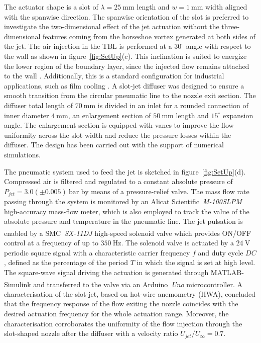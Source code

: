 The actuator shape is a slot of $\lambda = 25~\mathrm{mm}$ length and $w = 1~\mathrm{mm}$ width aligned with the spanwise direction. The spanwise orientation of the slot is preferred to investigate the two-dimensional effect of the jet actuation without the three-dimensional features coming from the horseshoe vortex generated at both sides of the jet.
The air injection in the TBL is performed at a $30^\circ$ angle with respect to the wall as shown in figure~\ref{fig:SetUp}(c). This inclination is suited to energize the lower region of the boundary layer, since the injected flow remains attached to the wall \citep{Steinfurth2021pulsedjet}. Additionally, this is a standard configuration for industrial applications, such as film cooling \citep{coletti2013}. A slot-jet diffuser was designed to ensure a smooth transition from the circular pneumatic line to the nozzle exit section. The diffuser total length of $70~\mathrm{mm}$ is divided in an inlet for a rounded connection of inner diameter $4~\mathrm{mm}$, an enlargement section of $50~\mathrm{mm}$ length and $15^\circ$ expansion angle. The enlargement section is equipped with vanes to improve the flow uniformity across the slot width and reduce the pressure losses within the diffuser. The design has been carried out with the support of numerical simulations.  

The pneumatic system used to feed the jet is sketched in figure~\ref{fig:SetUp}(d). Compressed air is filtered and regulated to a constant absolute pressure of $P_{jet} = 3.0 (\pm0.005)~\mathrm{bar}$ by means of a pressure-relief valve. The mass flow rate passing through the system is monitored by an Alicat Scientific\texttrademark~\textit{M-100SLPM} high-accuracy mass-flow meter, which is also employed to track the value of the absolute pressure and temperature in the pneumatic line. The jet pulsation is enabled by a SMC\textsuperscript{\textregistered}~\textit{SX-11DJ} high-speed solenoid valve which provides ON/OFF control at a frequency of up to $350~\mathrm{Hz}$. The solenoid valve is actuated by a $24~\mathrm{V}$ periodic square signal with a characteristic carrier frequency $f$ and duty cycle $DC$, defined as the percentage of the period $T$ in which the signal is set at high level. The square-wave signal driving the actuation is generated through MATLAB-Simulink\textsuperscript{\textregistered} and transferred to the valve via an Arduino\textsuperscript{\textregistered}~\textit{Uno} microcontroller. 
A characterisation of the slot-jet, based on hot-wire anemometry (HWA), concluded that the frequency response of the flow exiting the nozzle coincides with the desired actuation frequency for the whole actuation range. Moreover, the characterisation corroborates the uniformity of the flow injection through the slot-shaped nozzle after the diffuser with a velocity ratio $U_{jet}/U_\infty = 0.7$.

